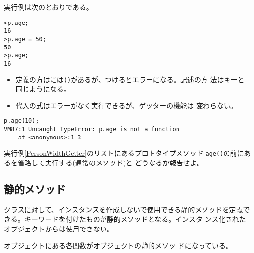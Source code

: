  実行例は次のとおりである。
\begin{Verbatim}
>p.age;
16
>p.age = 50;
50
>p.age;
16
\end{Verbatim}
\begin{itemize}
 \item 定義の方はには\texttt{()}があるが、つけるとエラーになる。記述の方
       法はキーと同じようになる。
 \item 代入の式はエラーがなく実行できるが、ゲッターの機能は
       変わらない。
\end{itemize}
\begin{Verbatim}
p.age(10);
VM87:1 Uncaught TypeError: p.age is not a function
    at <anonymous>:1:3
\end{Verbatim}
\begin{Prob}\upshape
実行例\ref{PersonWidthGetter}のリストにあるプロトタイプメソッド
 \texttt{age()}の前にあるを省略して実行する(通常のメソッド)と
 どうなるか報告せよ。
\end{Prob}
\subsection{静的メソッド}
クラスに対して、インスタンスを作成しないで使用できる静的メソッドを定義で
きる。キーワードを付けたものが静的メソッドとなる。インスタ
ンス化されたオブジェクトからは使用できない。

オブジェクトにある各関数がオブジェクトの静的メソッ
ドになっている。
\iffalse
